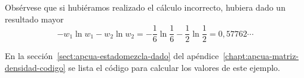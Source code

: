 \begin{enumerate}
    Obsérvese que si hubiéramos realizado el cálculo incorrecto, hubiera
    dado un resultado mayor
    \[
      -w_1\ln w_1 - w_2\ln w_2
      = -\frac{1}{6} \ln\frac{1}{6} - \frac{1}{2}\ln\frac{1}{2}
      = 0,57762\cdots
    \]
    
    En la sección~\ref{sect:apcua-estadomezcla-dado} del
    apéndice~\ref{chapt:apcua-matriz-densidad-codigo} se lista el código
    para calcular los valores de este ejemplo.
\end{enumerate}




